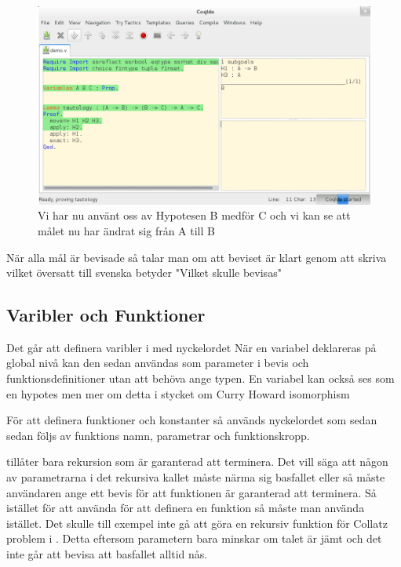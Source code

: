 \begin{figure}[H]
  \centering
  \includegraphics[width=150mm]{images/Proof_part3}
  \caption[Bevis i \coq IDE]
   {Vi har nu använt oss av Hypotesen B medför C och vi
    kan se att målet nu har ändrat sig från A till B}
\end{figure}

När alla mål är bevisade så talar man om att beviset är klart genom att
skriva  vilket översatt till svenska betyder
"Vilket skulle bevisas"

\subsection{Varibler och Funktioner}

Det går att definera varibler i \coq med nyckelordet 
När en variabel deklareras på global nivå kan den sedan användas som
parameter i bevis och funktionsdefinitioner utan att behöva ange typen.
En variabel kan också ses som en hypotes men mer om detta i stycket om
Curry Howard isomorphism

För att definera funktioner och konstanter så används nyckelordet
 som sedan sedan följs av funktions namn,
parametrar och funktionskropp.

\coq tillåter bara rekursion som är garanterad att terminera. Det vill
säga att någon av parametrarna i det rekursiva kallet måste närma sig
basfallet eller så måste användaren ange ett bevis för att funktionen är
garanterad att terminera. Så istället för att använda 
för att definera en funktion så måste man använda  istället.
Det skulle till exempel inte gå att göra en rekursiv
funktion för Collatz problem i \coq. Detta eftersom parametern bara minskar
om talet är jämt och det inte går att bevisa att basfallet alltid nås.

